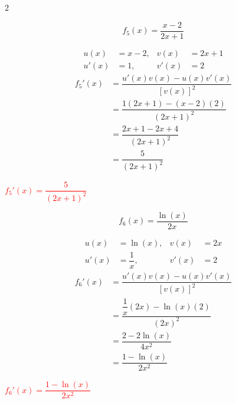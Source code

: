 \documentclass[11pt,a4paper]{article}
\begin{document}
\newpage
\begin{multicols}{2}
\begin{tcolorbox}[colback=red!5!white,colframe=red!75!black]
{

\vspace{4mm}


\[
f_5(x) = \dfrac{x-2}{2x+1}
\]

\vspace{4mm}

\[
\begin{aligned}
u(x) &= x-2, & v(x) &= 2x+1 \\
u'(x) &= 1, & v'(x) &= 2
\end{aligned}
\]
\vspace{2mm}
\[
\begin{aligned}
    f_5'(x) & = \dfrac{u'(x)v(x) - u(x)v'(x)}{[v(x)]^2}  \\[2mm]
            & = \dfrac{1(2x+1) - (x-2)(2)}{(2x+1)^2} \\[2mm]
            & = \dfrac{2x+1 - 2x+4}{(2x+1)^2} \\[2mm]
            & = \dfrac{5}{(2x+1)^2}
\end{aligned}
\]
\vspace{2mm}
\begin{center}
\textbf{\textcolor{red}{$f_5'(x) = \dfrac{5}{(2x+1)^2}$}}
\end{center}

\vspace{20mm}

}
\end{tcolorbox}

\begin{tcolorbox}[colback=red!5!white,colframe=red!75!black]
{

\vspace{4mm}

\[
f_6(x) = \dfrac{\ln(x)}{2x}
\]

\vspace{4mm}

\[
\begin{aligned}
u(x) &= \ln(x), & v(x) &= 2x \\
u'(x) &= \dfrac{1}{x}, & v'(x) &= 2
\end{aligned}
\]
\vspace{2mm}
\[
\begin{aligned}
    f_6'(x) & = \dfrac{u'(x)v(x) - u(x)v'(x)}{[v(x)]^2}  \\[2mm]
            & = \dfrac{\dfrac{1}{x}(2x) - \ln(x)(2)}{(2x)^2} \\[2mm]
            & = \dfrac{2 - 2\ln(x)}{4x^2} \\[2mm]
            & = \dfrac{1 - \ln(x)}{2x^2}
\end{aligned}
\]
\vspace{2mm}
\begin{center}
\textbf{\textcolor{red}{$f_6'(x) = \dfrac{1 - \ln(x)}{2x^2}$}}
\end{center}

\vspace{13mm}

}
\end{tcolorbox}
\end{multicols}
\end{document}
